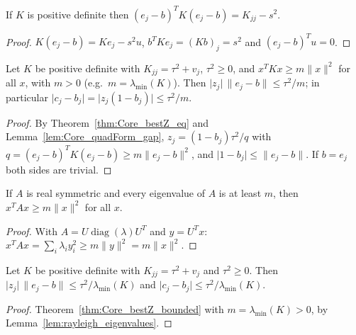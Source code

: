 \begin{lemma}\label{lem:Core_quadForm_gap}
  \leanok
  If $K$ is positive definite then
  $(e_j - b)^T K (e_j - b) = K_{jj} - s^2$.
\end{lemma}
\begin{proof}
  \leanok
  $K(e_j - b) = Ke_j - s^2 u$, $b^TKe_j = (Kb)_j = s^2$ and $(e_j - b)^Tu = 0$.
\end{proof}

\begin{theorem}\label{thm:Core_bestZ_bounded}
  \leanok
  Let $K$ be positive definite with $K_{jj} = \tau^2 + v_j$, $\tau^2 \ge 0$, and
  $x^TKx \ge m\lVert x\rVert^2$ for all $x$, with $m > 0$ (e.g.\
  $m = \lambda_{\min}(K)$). Then
  $\lvert z_j\rvert\,\lVert e_j - b\rVert \le \tau^2/m$; in particular
  $\lvert c_j - b_j\rvert = \lvert z_j(1 - b_j)\rvert \le \tau^2/m$.
\end{theorem}
\begin{proof}
  \leanok
  By Theorem~\ref{thm:Core_bestZ_eq} and Lemma~\ref{lem:Core_quadForm_gap},
  $z_j = (1 - b_j)\tau^2/q$ with $q = (e_j - b)^TK(e_j - b) \ge m\lVert e_j - b\rVert^2$,
  and $\lvert 1 - b_j\rvert \le \lVert e_j - b\rVert$. If $b = e_j$ both sides
  are trivial.
\end{proof}

\begin{lemma}[Rayleigh bound]\label{lem:rayleigh_eigenvalues}
  \leanok
  If $A$ is real symmetric and every eigenvalue of $A$ is at least $m$, then
  $x^TAx \ge m\lVert x\rVert^2$ for all $x$.
\end{lemma}
\begin{proof}
  \leanok
  With $A = U\operatorname{diag}(\lambda)U^T$ and $y = U^Tx$:
  $x^TAx = \sum_i \lambda_i y_i^2 \ge m\lVert y\rVert^2 = m\lVert x\rVert^2$.
\end{proof}

\begin{corollary}[The bound with $\lambda_{\min}$]\label{cor:Core_bestZ_bounded_eig}
  \leanok
  Let $K$ be positive definite with $K_{jj} = \tau^2 + v_j$ and $\tau^2 \ge 0$. Then
  $\lvert z_j\rvert\,\lVert e_j - b\rVert \le \tau^2/\lambda_{\min}(K)$ and
  $\lvert c_j - b_j\rvert \le \tau^2/\lambda_{\min}(K)$.
\end{corollary}
\begin{proof}
  \leanok
  Theorem~\ref{thm:Core_bestZ_bounded} with $m = \lambda_{\min}(K) > 0$, by
  Lemma~\ref{lem:rayleigh_eigenvalues}.
\end{proof}

